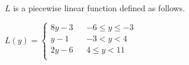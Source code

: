 \documentclass{ximera}
\begin{document}
\begin{definition}
$L$ is a piecewise linear function defined as follows.

$L(y) =   
\left \{ \begin{aligned}     
8 y - 3 && -6 \leq y \leq -3 \\        
y - 1 && -3 < y < 4 \\      
2y -6 && 4 \leq y < 11\\       
\end{aligned} \right .$ 


\end{definition}
\end{document}
